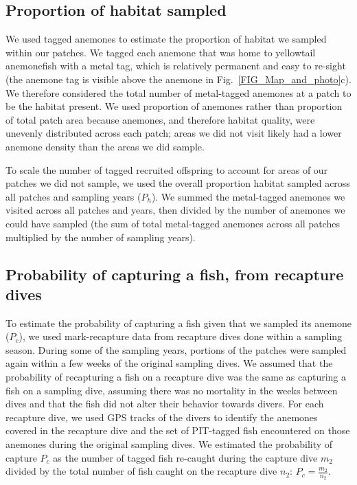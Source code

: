 \documentclass[12pt, oneside]{article}   	%
\begin{document}
\subsection{Proportion of habitat sampled} \label{APP_SEC_ProbHabSampled}

We used tagged anemones to estimate the proportion of habitat we sampled within our patches. We tagged each anemone that was home to yellowtail anemonefish with a metal tag, which is relatively permanent and easy to re-sight (the anemone tag is visible above the anemone in Fig.\ \ref{FIG_Map_and_photo}c). We therefore considered the total number of metal-tagged anemones at a patch to be the habitat present. We used proportion of anemones rather than proportion of total patch area because anemones, and therefore habitat quality, were unevenly distributed across each patch; areas we did not visit likely had a lower anemone density than the areas we did sample. %

To scale the number of tagged recruited offspring to account for areas of our patches we did not sample, we used the overall proportion habitat sampled across all patches and sampling years ($P_h$). We summed the metal-tagged anemones we visited across all patches and years, then divided by the number of anemones we could have sampled (the sum of total metal-tagged anemones across all patches multiplied by the number of sampling years).

\subsection{Probability of capturing a fish, from recapture dives} \label{APP_SEC_ProbR}

To estimate the probability of capturing a fish given that we sampled its anemone ($P_c$), we used mark-recapture data from recapture dives done within a sampling season. During some of the sampling years, portions of the patches were sampled again within a few weeks of the original sampling dives. We assumed that the probability of recapturing a fish on a recapture dive was the same as capturing a fish on a sampling dive, assuming there was no mortality in the weeks between dives and that the fish did not alter their behavior towards divers. For each recapture dive, we used GPS tracks of the divers to identify the anemones covered in the recapture dive and the set of PIT-tagged fish encountered on those anemones during the original sampling dives. We estimated the probability of capture $P_c$ as the number of tagged fish re-caught during the capture dive $m_2$ divided by the total number of fish caught on the recapture dive $n_2$: $P_c = \frac{m_2}{n_2}$. %
\end{document}
